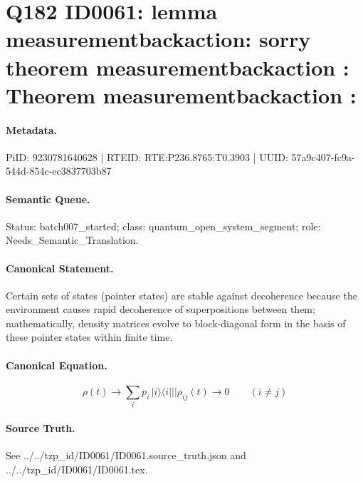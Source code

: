 \section*{Q182 ID0061: lemma measurementbackaction: sorry theorem measurementbackaction : Theorem measurementbackaction :}
\paragraph{Metadata.}
PiID: 9230781640628 | RTEID: RTE:P236.8765:T0.3903 | UUID: 57a9c407-fc9a-544d-854c-ec3837703b87

\paragraph{Semantic Queue.}
Status: batch007\_started; class: quantum\_open\_system\_segment; role: Needs\_Semantic\_Translation.

\paragraph{Canonical Statement.}
Certain sets of states (pointer states) are stable against decoherence because the environment causes rapid decoherence of superpositions between them; mathematically, density matrices evolve to block-diagonal form in the basis of these pointer states within finite time.

\paragraph{Canonical Equation.}
\[
\rho(t) \to \sum_{i} p_{i}\,\lvert i\rangle\langle i\rvert || \rho_{ij}(t) \to 0 \qquad (i \neq j)
\]

\paragraph{Source Truth.}
See ../../tzp\_id/ID0061/ID0061.source\_truth.json and ../../tzp\_id/ID0061/ID0061.tex.
